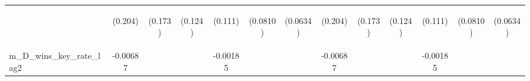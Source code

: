 \documentclass[]{article}
\begin{document}
\begin{center}
\begin{tabular}{lcccccccccccc}
\vspace{4pt} & \begin{footnotesize}(0.204)\end{footnotesize} & \begin{footnotesize}(0.173)\end{footnotesize} & \begin{footnotesize}(0.124)\end{footnotesize} & \begin{footnotesize}(0.111)\end{footnotesize} & \begin{footnotesize}(0.0810)\end{footnotesize} & \begin{footnotesize}(0.0634)\end{footnotesize} & \begin{footnotesize}(0.204)\end{footnotesize} & \begin{footnotesize}(0.173)\end{footnotesize} & \begin{footnotesize}(0.124)\end{footnotesize} & \begin{footnotesize}(0.111)\end{footnotesize} & \begin{footnotesize}(0.0810)\end{footnotesize} & \begin{footnotesize}(0.0634)\end{footnotesize} \\
m\_D\_wins\_key\_rate\_lag2 & -0.00687 &  &  & -0.00185 &  &  & -0.00687 &  &  & -0.00185 &  &  \\

\end{tabular}
\end{center}
\end{document}
